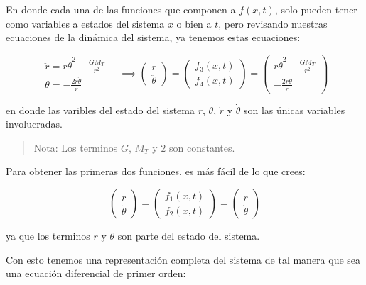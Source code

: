\documentclass[11pt]{article}
\begin{document}
    En donde cada una de las funciones que componen a \(f(x, t)\), solo
pueden tener como variables a estados del sistema \(x\) o bien a \(t\),
pero revisando nuestras ecuaciones de la dinámica del sistema, ya
tenemos estas ecuaciones:

    \begin{equation}
\begin{matrix}
\ddot{r} = r \dot{\theta}^2 - \frac{GM_T}{r^2} \\
\ddot{\theta} = - \frac{2 \dot{r} \dot{\theta}}{r}
\end{matrix} \quad \implies
\begin{pmatrix}
\ddot{r} \\
\ddot{\theta}
\end{pmatrix} = 
\begin{pmatrix}
f_3(x, t) \\
f_4(x, t)
\end{pmatrix} =
\begin{pmatrix}
r \dot{\theta}^2 - \frac{GM_T}{r^2} \\
- \frac{2 \dot{r} \dot{\theta}}{r}
\end{pmatrix}
\end{equation}

    en donde las varibles del estado del sistema \(r\), \(\theta\),
\(\dot{r}\) y \(\dot{\theta}\) son las únicas variables involucradas.

\begin{quote}
Nota: Los terminos \(G\), \(M_T\) y \(2\) son constantes.
\end{quote}

    Para obtener las primeras dos funciones, es más fácil de lo que crees:

    \begin{equation}
\begin{pmatrix}
\dot{r} \\
\dot{\theta}
\end{pmatrix} = 
\begin{pmatrix}
f_1(x, t) \\
f_2(x, t)
\end{pmatrix} =
\begin{pmatrix}
\dot{r} \\
\dot{\theta}
\end{pmatrix}
\end{equation}

    ya que los terminos \(\dot{r}\) y \(\dot{\theta}\) son parte del estado
del sistema.

    Con esto tenemos una representación completa del sistema de tal manera
que sea una ecuación diferencial de primer orden:
\end{document}

